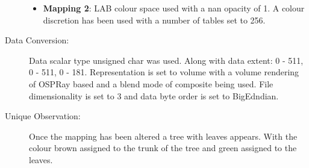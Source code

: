 \begin{description}
	\begin{itemize}
		\tightlist
		\item
		\textbf{Mapping 2}:
		\hfill \break 
			LAB colour space used with a nan opacity of 1. A colour discretion has been used with a number of tables set to 256.
	\end{itemize}
	\item[Data Conversion:] 
	\hfill \break 
		Data scalar type unsigned char was used. Along with data extent: 0 - 511, 0 - 511, 0 - 181. Representation is set to volume with a volume rendering of OSPRay based and a blend mode of composite being used. File dimensionality is set to 3 and data byte order is set to BigEdndian.
	\item[Unique Observation:]
	\hfill \break
		Once the mapping has been altered a tree with leaves appears. With the colour brown assigned to the trunk of the tree and green assigned to the leaves.
\end{description}